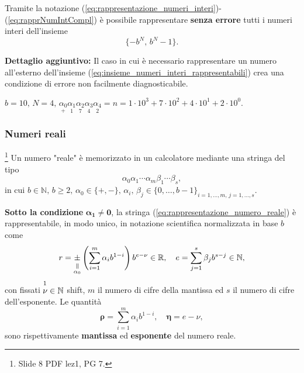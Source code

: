 Tramite la notazione (\ref{eq:rappresentazione_numeri_interi})-(\ref{eq:rapprNumIntCompl}) è possibile rappresentare \textbf{senza errore} tutti i numeri interi dell'insieme
\begin{equation}\label{eq:insieme_numeri_interi_rappresentabili}
	\{-b^N,\,b^N-1\}.
\end{equation}

\textbf{Dettaglio aggiuntivo:} Il caso in cui è necessario rappresentare un numero all'esterno dell'insieme (\ref{eq:insieme_numeri_interi_rappresentabili}) crea una condizione di errore non facilmente diagnosticabile.

\begin{example}
	$b=10,\, N=4,\, \underset{+}{\alpha_0}\underset{1}{\alpha_1}\underset{7}{\alpha_2}\underset{4}{\alpha_3}\underset{2}{\alpha_4}=n=1\cdot 10^3+7\cdot 10^2+4\cdot 10^1+2\cdot 10^0.$
\end{example}

\subsubsection{Numeri reali}\footnote{Slide 8 PDF lez1, PG 7.}
Un numero "reale" è memorizzato in un calcolatore mediante una stringa del tipo
\begin{equation}\label{eq:rappresentazione_numero_reale}
	\alpha_0\alpha_1\cdots\alpha_m\beta_1\cdots\beta_s,
\end{equation}
in cui $b\in\mathbb N,\, b\geq 2,\, \alpha_0\in\{+,-\},\, \alpha_i,\,\beta_j\in\{0,\hdots,b-1\}_{i=1,\hdots,m,\, j=1,\hdots,s}.$
\begin{definition}
	\textbf{Sotto la condizione} $\boldsymbol{\alpha_1\neq 0}$, la stringa (\ref{eq:rappresentazione_numero_reale}) è rappresentabile, in modo unico, in notazione scientifica normalizzata in base $b$ come
	\begin{equation}\label{eq:rappresentazione_scientifica_normalizzata}
		r=\equalto{\pm}{\alpha_0}\left(\sum_{i=1}^m\alpha_ib^{1-i}\right)b^{e-\nu}\in\mathbb{R},\quad e=\sum_{j=1}^s\beta_jb^{s-j}\in\mathbb N,
	\end{equation}
	con fissati $\overset{\footnotemark}{\nu}\in\mathbb N$ shift, $m$ il numero di cifre della mantissa ed $s$ il numero di cifre dell'esponente. Le quantità
	\begin{equation}\label{eq:mantissa_esponente_rappresentazione_numero_reale}
		\boldsymbol\rho = \sum_{i=1}^m\alpha_ib^{1-i},\quad \boldsymbol\eta = e-\nu,
	\end{equation}
	sono rispettivamente \textbf{mantissa} ed \textbf{esponente} del numero reale.
\end{definition}

